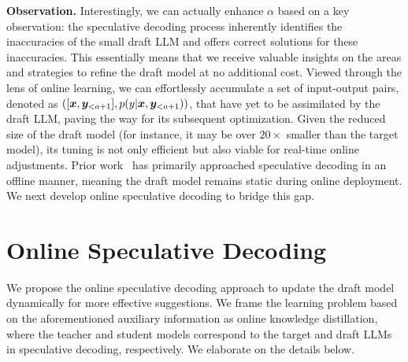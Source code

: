 {\bf Observation.} Interestingly, we can actually enhance \(\alpha\) based on a key observation: the speculative decoding process inherently identifies the inaccuracies of the small draft LLM and offers correct solutions for these inaccuracies. This essentially means that we receive valuable insights on the areas and strategies to refine the draft model at no additional cost. 
Viewed through the lens of online learning, we can effortlessly accumulate a set of input-output pairs, denoted as \( ([{\bm{x}}, {\bm{y}}_{<a+1}], p(y|{\bm{x}}, {{\bm{y}}}_{<a+1})) \), that have yet to be assimilated by the draft LLM, paving the way for its subsequent optimization. Given the reduced size of the draft model (for instance, it may be over $20\times$ smaller than the target model), its tuning is not only efficient but also viable for real-time online adjustments. 
Prior work~\citep{leviathan2023fast,miao2023specinfer} has primarily approached speculative decoding in an offline manner, meaning the draft model remains static during online deployment. We next develop online speculative decoding to bridge this gap.







\section{Online Speculative Decoding}
\label{sec:methodology}
We propose the online speculative decoding approach to update the draft model dynamically for more effective suggestions. 
We frame the learning problem based on the aforementioned auxiliary information as online knowledge distillation, where the teacher and student models correspond to the target and draft LLMs in speculative decoding, respectively. 
We elaborate on the details below. 


